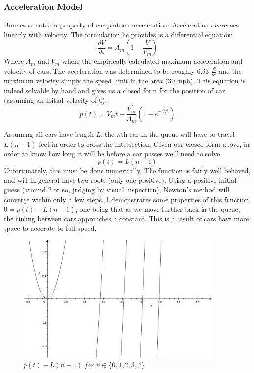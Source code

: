 \documentclass[a4paper,12pt]{article}
\begin{document}
\subsubsection{Acceleration Model}
Bonneson \cite{bonneson} noted a property of car platoon acceleration: Acceleration decreases linearly with velocity.
The formulation he provides is a differential equation:
\[
\frac{dV}{dt} = A_{m} \left( 1 - \frac{V}{V_{m}} \right)
\]
Where $A_m$ and $V_m$ where the empirically calculated maximum acceleration and velocity of cars. The acceleration was
determined to be roughly 6.63 $\frac{ft}{s^2}$ and the maximum velocity simply the speed limit in the area (30 mph).
This equation is indeed solvable by hand and gives us a closed form for the position of car (assuming an initial velocity of 0):
\[
    p(t) = V_{m}t - \frac{V_{m}^2}{A_{m}} \left( 1 - e^{-\frac{A_{m}t}{V_{m}} } \right)
\]

Assuming all cars have length $L$, the $n$th car in the queue will have to travel $L(n-1)$ feet in order to cross the
intersection. Given our closed form above, in order to know how long it will be before a car passes we'll need to solve
\[
p(t) = L(n-1)
\]
Unfortunately, this must be done numerically. The function is fairly well behaved, and will in general have two roots
(only one positive). Using a positive initial guess (around 2 or so, judging by visual inspection), Newton's method
will converge within only a few steps. \ref{fig:acceleration} demonstrates some properties of this function
$0 = p(t) - L(n-1)$, one being
that as we move further back in the queue, the timing between cars approaches a constant. This is a result of cars
have more space to accerate to full speed.

\begin{figure}
\begin{center}  
\includegraphics[width=4in]{../acceleration.pdf}  
\caption{\small \sl $p(t) - L(n-1)$ for $n \in \{0, 1, 2, 3, 4\}$ \label{fig:acceleration}}  
\end{center}  
\end{figure} 
\end{document}
